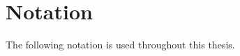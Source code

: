 \documentclass[11pt,a4,twosided,singlespacing,titlepagenumber=on]{scrreprt}
\numberwithin{equation}{chapter} %
\newtheorem{definition}[theorem]{Definition}%
\theoremstyle{remark}
\newcommand\Tau{\mathcal{T}}
\begin{document}

% 
% 
% 

\chapter*{Notation}
The following notation is used throughout this thesis.
\end{document}
